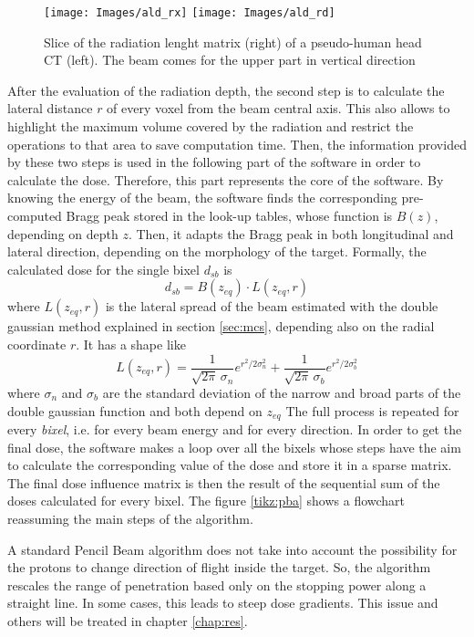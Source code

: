 \documentclass[12pt, a4paper, twoside]{book}
\begin{document}
\begin{figure}[!t]
\centering
\texttt{[image: Images/ald\_rx]}
\texttt{[image: Images/ald\_rd]}
\caption{Slice of the radiation lenght matrix (right) of a pseudo-human head CT (left). The beam comes for the upper part in vertical direction}
\label{fig:rd}
\end{figure}
After the evaluation of the radiation depth, the second step is to calculate the lateral distance  $r$ of every voxel from the beam central axis. This also allows to highlight the maximum volume covered by the radiation and restrict the operations to that area to save computation time. 
Then, the information provided by these two steps is used in the following part of the software in order to calculate the dose. Therefore, this part represents the core of the software. By knowing the energy of the beam, the software finds the corresponding pre-computed Bragg peak stored in the look-up tables, whose function is $B(z)$, depending on depth $z$. Then, it adapts the Bragg peak in both longitudinal and lateral direction, depending on the morphology of the target. 
Formally, the calculated dose for the single bixel $d_{sb}$ is 	
\[
d_{sb} = B(z_{eq}) \cdot L(z_{eq},r)
\]
where $L(z_{eq},r)$ is the lateral spread of the beam estimated with the double gaussian method explained in section \ref{sec:mcs}, depending also on the radial coordinate $r$. It has a shape like
\[
L(z_{eq},r) = \frac{1}{\sqrt{2\pi}\,\sigma_n}e^{r^2/2\sigma_n^2} + \frac{1}{\sqrt{2\pi}\,\sigma_b}e^{r^2/2\sigma_b^2} 
\]
where $\sigma_n$ and $\sigma_b$ are the standard deviation of the narrow and broad parts of the double gaussian function and both depend on $z_{eq}$
The full process is repeated for every \emph{bixel}, i.e. for every beam energy and for every direction. In order to get the final dose, the software makes a loop over all the bixels whose steps have the aim to calculate the corresponding value of the dose and store it in a sparse matrix. The final dose influence matrix is then the result of the sequential sum of the doses calculated for every bixel.
The figure \ref{tikz:pba} shows a flowchart reassuming the main steps of the algorithm.

A standard Pencil Beam algorithm does not take into account the possibility for the protons to change direction of flight inside the target. So, the algorithm rescales the range of penetration based only on the stopping power along a straight line. In some cases, this leads to steep dose gradients. This issue and others will be treated in chapter \ref{chap:res}.
\end{document}
